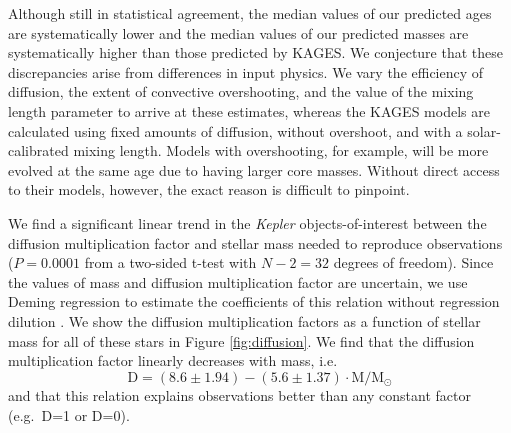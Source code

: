 \documentclass[manuscript,linenumbers]{aastex6}
\newif\ifref
\newcommand{\mb}[1]{\ifref\boldmath\textbf{#1}\unboldmath\else #1\fi}
\begin{document}
Although still in statistical agreement, the median values of our predicted ages are systematically lower and the median values of our predicted masses are systematically higher than those predicted by KAGES. We conjecture that these discrepancies arise from differences in input physics. We vary the efficiency of diffusion, the extent of convective overshooting, and the value of the mixing length parameter to arrive at these estimates, whereas \mb{the KAGES} models are calculated using fixed \mb{amounts} of diffusion, without overshoot, and with a solar-calibrated mixing length. Models with overshooting, for example, will be more evolved at the same age due to having larger core masses. Without direct access to their models, however, the exact reason is difficult to pinpoint. 

We find a significant linear trend in the \emph{Kepler} objects-of-interest between the diffusion multiplication factor and stellar mass needed to reproduce observations ($P = 0.0001$ from a two-sided t-test with $N-2=32$ degrees of freedom). Since the values of mass and diffusion \mb{multiplication} factor are uncertain, we use Deming regression to estimate the coefficients of this relation without regression dilution \citep{deming1943statistical}. We show the diffusion multiplication factors as a function of stellar mass for all of these stars in Figure \ref{fig:diffusion}. We find that the diffusion \mb{multiplication} factor linearly decreases with mass, i.e.\ 
\begin{equation} \label{eq:diffusion}
    \text{D} = ( 8.6 \pm 1.94 ) - ( 5.6 \pm 1.37 ) \cdot \text{M}/\text{M}_\odot
\end{equation}
and that this relation explains observations better than any constant factor (e.g.\ D=1 or D=0). 
\end{document}
